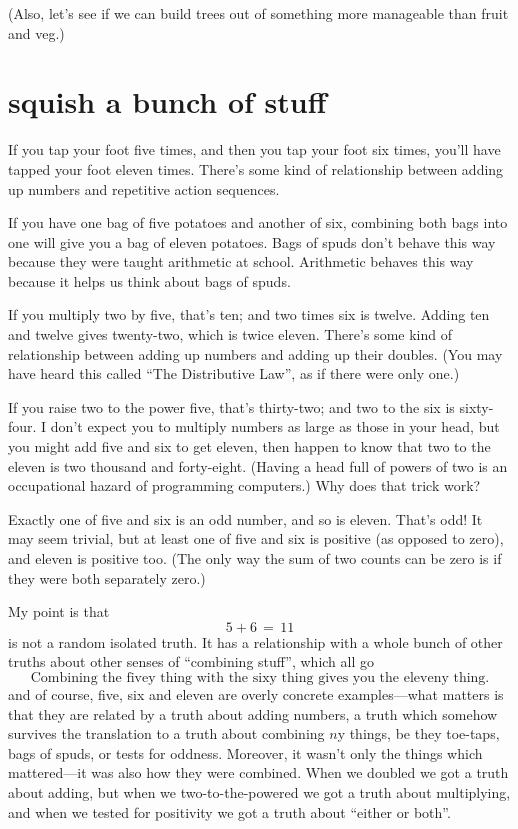 \documentclass{book}
\begin{document}
(Also, let's see if we can build trees out of something more manageable than fruit and veg.)



\chapter{squish a bunch of stuff}

If you tap your foot five times, and then you tap your foot six times, you'll have tapped your foot eleven times. There's some kind of relationship between adding up numbers and repetitive action sequences.

If you have one bag of five potatoes and another of six, combining both bags into one will give you a bag of eleven potatoes. Bags of spuds don't behave this way because they were taught arithmetic at school. Arithmetic behaves this way because it helps us think about bags of spuds.

If you multiply two by five, that's ten; and two times six is twelve. Adding ten and twelve gives twenty-two, which is twice eleven. There's some kind of relationship between adding up numbers and adding up their doubles. (You may have heard this called ``The Distributive Law'', as if there were only one.)

If you raise two to the power five, that's thirty-two; and two to the six is sixty-four. I don't expect you to multiply numbers as large as those in your head, but you might add five and six to get eleven, then happen to know that two to the eleven is two thousand and forty-eight. (Having a head full of powers of two is an occupational hazard of programming computers.) Why does that trick work?

Exactly one of five and six is an odd number, and so is eleven. That's odd! It may seem trivial, but at least one of five and six is positive (as opposed to zero), and eleven is positive too. (The only way the sum of two counts can be zero is if they were both separately zero.)

My point is that
\[
5 + 6 \,=\, 11
\]
is not a random isolated truth. It has a relationship with a whole bunch of other truths about other senses of ``combining stuff'', which all go
\[
\mbox{Combining the fivey thing with the sixy thing gives you the eleveny thing.}
\]
and of course, five, six and eleven are overly concrete examples---what matters is that they are related by a truth about adding numbers, a truth which somehow survives the translation to a truth about combining $n$y things, be they toe-taps, bags of spuds, or tests for oddness. Moreover, it wasn't only the things which mattered---it was also how they were combined. When we doubled we got a truth about adding, but when we two-to-the-powered we got a truth about multiplying, and when we tested for positivity we got a truth about ``either or both''.
\end{document}
